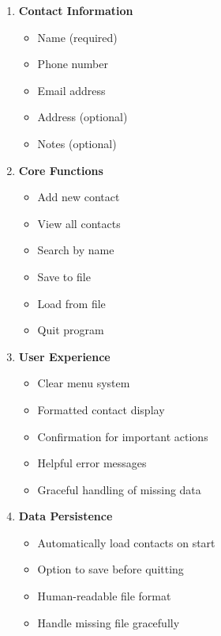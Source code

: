\documentclass[
  letterpaper,
  DIV=11,
  numbers=noendperiod,
  oneside]{scrreprt}
\providecommand{\tightlist}{%
  \setlength{\itemsep}{0pt}\setlength{\parskip}{0pt}}\usepackage{longtable,booktabs,array}
\begin{document}
\begin{enumerate}
\def\labelenumi{\arabic{enumi}.}
\tightlist
\item
  \textbf{Contact Information}

  \begin{itemize}
  \tightlist
  \item
    Name (required)
  \item
    Phone number
  \item
    Email address
  \item
    Address (optional)
  \item
    Notes (optional)
  \end{itemize}
\item
  \textbf{Core Functions}

  \begin{itemize}
  \tightlist
  \item
    Add new contact
  \item
    View all contacts
  \item
    Search by name
  \item
    Save to file
  \item
    Load from file
  \item
    Quit program
  \end{itemize}
\item
  \textbf{User Experience}

  \begin{itemize}
  \tightlist
  \item
    Clear menu system
  \item
    Formatted contact display
  \item
    Confirmation for important actions
  \item
    Helpful error messages
  \item
    Graceful handling of missing data
  \end{itemize}
\item
  \textbf{Data Persistence}

  \begin{itemize}
  \tightlist
  \item
    Automatically load contacts on start
  \item
    Option to save before quitting
  \item
    Human-readable file format
  \item
    Handle missing file gracefully
  \end{itemize}
\end{enumerate}
\end{document}
